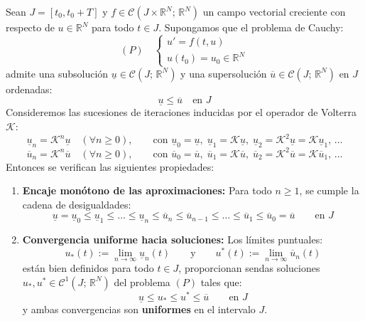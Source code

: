 \begin{teorema}\label{teo:kamke}
    Sean $J = [t_0, t_0 + T]$ y $f \in \mathcal{C}(J \times \mathbb{R}^N; \, \mathbb{R}^N)$ un campo vectorial creciente con respecto de $u \in \mathbb{R}^N$ para todo $t \in J$.
    Supongamos que el problema de Cauchy:
    \[
        (P) \quad
        \begin{cases}
            u' = f(t, u) \\
            u(t_0) = u_0 \in \mathbb{R}^N
        \end{cases}
    \]
    admite una subsolución $\underline{u} \in \mathcal{C}(J; \, \mathbb{R}^N)$ y una supersolución $\overline{u} \in \mathcal{C}(J; \, \mathbb{R}^N)$ en $J$ ordenadas:
    \[
        \underline{u} \leq \overline{u} \quad \text{en } J
    \]
    Consideremos las sucesiones de iteraciones inducidas por el operador de Volterra $\mathcal{K}$:
    \[
        \underline{u}_n = \mathcal{K}^n \underline{u} \quad (\forall n \geq 0), \qquad \text{con } \underline{u}_0 = \underline{u}, \; \underline{u}_1 = \mathcal{K}\underline{u}, \; \underline{u}_2 = \mathcal{K}^2\underline{u} = \mathcal{K}\underline{u}_1, \, \dots
    \]
    \[
        \overline{u}_n = \mathcal{K}^n \overline{u} \quad (\forall n \geq 0), \qquad \text{con } \overline{u}_0 = \overline{u}, \; \overline{u}_1 = \mathcal{K}\overline{u}, \; \overline{u}_2 = \mathcal{K}^2\overline{u} = \mathcal{K}\overline{u}_1, \, \dots
    \]
    Entonces se verifican las siguientes propiedades:
    \begin{enumerate}
        \item \textbf{Encaje monótono de las aproximaciones:} Para todo $n \geq 1$, se cumple la cadena de desigualdades:
        \[
            \underline{u} = \underline{u}_0 \leq \underline{u}_1 \leq \dots \leq \underline{u}_n \leq \overline{u}_n \leq \overline{u}_{n-1} \leq \dots \leq \overline{u}_1 \leq \overline{u}_0 = \overline{u} \qquad \text{en } J
        \]
        \item \textbf{Convergencia uniforme hacia soluciones:} Los límites puntuales:
        \[
            u_*(t) := \lim_{n \to \infty} \underline{u}_n(t) \qquad \text{y} \qquad u^*(t) := \lim_{n \to \infty} \overline{u}_n(t)
        \]
        están bien definidos para todo $t \in J$, proporcionan sendas soluciones $u_*, u^* \in \mathcal{C}^1(J; \, \mathbb{R}^N)$ del problema $(P)$ tales que:
        \[
            \underline{u} \leq u_* \leq u^* \leq \overline{u} \qquad \text{en } J
        \]
        y ambas convergencias son \textbf{uniformes} en el intervalo $J$.

\end{enumerate}
\end{teorema}

